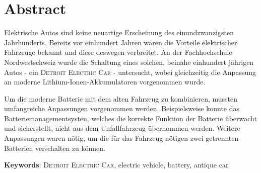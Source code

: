 \chapter*{Abstract}
Elektrische Autos sind keine neuartige Erscheinung des einundzwanzigsten Jahrhunderts. Bereits vor einhundert Jahren waren die Vorteile elektrischer Fahrzeuge bekannt und diese deswegen verbreitet. An der Fachhochschule Nordwestschweiz wurde die Schaltung eines solchen, beinahe einhundert jährigen Autos - ein \textsc{Detroit Electric Car} - untersucht, wobei gleichzeitig die Anpassung an moderne Lithium-Ionen-Akkumulatoren vorgenommen wurde.

Um die moderne Batterie mit dem alten Fahrzeug zu kombinieren, mussten umfangreiche Anpassungen vorgenommen werden. Beispielsweise konnte das Batteriemanagementsysten, welches die korrekte Funktion der Batterie überwacht und sicherstellt, nicht aus dem Unfallfahrzeug übernommen werden. Weitere Anpassungen waren nötig, um die für das Fahrzeug nötigen zwei getrennten Batterien verschalten zu können.

\textbf{Keywords}: \textsc{Detroit Electric Car}, electric vehicle, battery, antique car